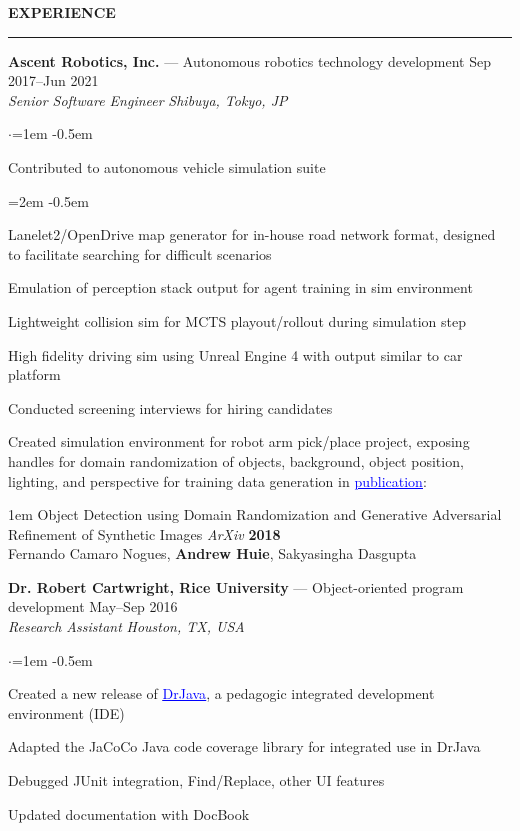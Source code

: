 \documentclass[10pt, a4paper]{article}
\newenvironment{aSection}[1]{
    \medskip \textbf{\uppercase{#1}}
    \smallskip
    \hrule
    \begin{list}{}{
            \setlength{\leftmargin}{1.5em}
        }
    \item[]
    }{
    \end{list}
}
\newenvironment{expSubsection}[4]{
    {#1} \hfill {#2} \\
    \textit{#3} \hfill \textit{#4}
    \smallskip
    \begin{list}{$\cdot$}{\leftmargin=1em}
    \itemsep -0.5em \vspace{-0.5em}
    }{
    \end{list}
    \vspace{0.5em}
}
\newenvironment{subList}{
    \begin{list}{\raisebox{.4ex}{\tiny$\succ$}}{\leftmargin=2em}
    \itemsep -0.5em \vspace{-0.5em}
    }{
    \end{list}
}
\begin{document}
\begin{aSection}{Experience}
    \begin{expSubsection}
        {\textbf{Ascent Robotics, Inc.} --- Autonomous robotics technology development}
        {Sep 2017--Jun 2021}
        {Senior Software Engineer}
        {Shibuya, Tokyo, JP}
    \item Contributed to autonomous vehicle simulation suite
        \begin{subList}
            \item Lanelet2/OpenDrive map generator for in-house road network format, designed to
                facilitate searching for difficult scenarios
            \item Emulation of perception stack output for agent training in sim environment
            \item Lightweight collision sim for MCTS playout/rollout during simulation step
            \item High fidelity driving sim using Unreal Engine 4 with output similar to car
                platform
        \end{subList}
    \item Conducted screening interviews for hiring candidates
    \item Created simulation environment for robot arm pick/place project, exposing handles for
        domain randomization of objects, background, object position, lighting, and perspective for
        training data generation in
        \href{https://arxiv.org/abs/1805.11778}{\textcolor{blue}{\underline{publication}}}:
        \begin{adjustwidth}{1em}{}
            \vspace{-0.5em}
            Object Detection using Domain Randomization and Generative Adversarial Refinement
            of Synthetic Images \textit{ArXiv} \textbf{2018}\\
            \hspace*{1em} Fernando Camaro Nogues, \textbf{Andrew Huie}, Sakyasingha Dasgupta
        \end{adjustwidth}
    \end{expSubsection}

    \begin{expSubsection}
        {\textbf{Dr. Robert Cartwright, Rice University} --- Object-oriented program development}
        {May--Sep 2016}
        {Research Assistant}
        {Houston, TX, USA}
    \item Created a new release of
        \href{http://www.drjava.org}{\textcolor{blue}{\underline{DrJava}}}, a pedagogic integrated
        development environment (IDE)
    \item Adapted the JaCoCo Java code coverage library for integrated use in DrJava
    \item Debugged JUnit integration, Find/Replace, other UI features
    \item Updated documentation with DocBook
    \end{expSubsection}


\end{aSection}
\end{document}
